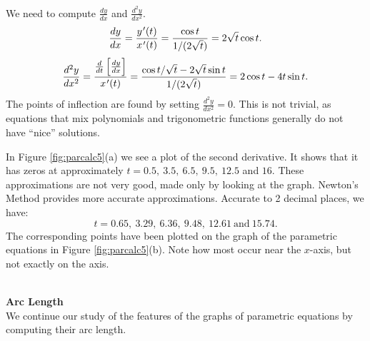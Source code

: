 {We need to compute $\frac{dy}{dx}$ and $\frac{d^2y}{dx^2}$. 
$$\frac{dy}{dx} = \frac{y\hskip.75pt'(t)}{x\hskip.75pt'(t)} = \frac{\cos t}{1/(2\sqrt{t})} = 2\sqrt{t}\cos t.$$
$$\frac{d^2y}{dx^2} = \frac{\frac{d}{dt}\left[\frac{dy}{dx}\right]}{x\hskip.75pt'(t)} = \frac{\cos t/\sqrt{t}-2\sqrt{t}\sin t}{1/(2\sqrt{t})}=2\cos t-4t\sin t.$$
The points of inflection are found by setting $\frac{d^2y}{dx^2}=0$. This is not trivial, as equations that mix polynomials and trigonometric functions generally do not have ``nice'' solutions. 

In Figure \ref{fig:parcalc5}(a) we see a plot of the second derivative. It shows that it has zeros at approximately $t=0.5,\ 3.5,\ 6.5,\ 9.5,\ 12.5$ and $16$. These approximations are not very good, made only by looking at the graph. Newton's Method provides more accurate approximations. Accurate to 2 decimal places, we have:
$$t=0.65,\ 3.29,\ 6.36,\ 9.48,\ 12.61\ \text{and}\ 15.74.$$
The corresponding points have been plotted on the graph of the parametric equations in Figure \ref{fig:parcalc5}(b). Note how most occur near the $x$-axis, but not exactly on the axis. 
}\\

\noindent\textbf{\large Arc Length}\\

We continue our study of the features of the graphs of parametric equations by computing their arc length.

